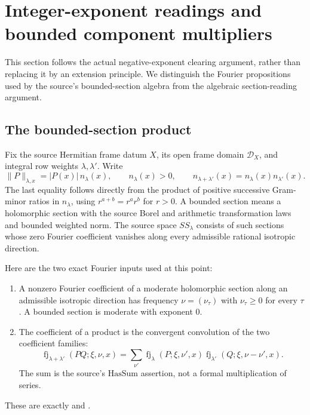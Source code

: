 \section{Integer-exponent readings and bounded component multipliers}
\label{sec:sr-source-integer-reading}
This section follows the actual negative-exponent clearing argument,
rather than replacing it by an extension principle.
We distinguish the Fourier propositions used by the source's
bounded-section algebra from the algebraic section-reading argument.

\subsection{The bounded-section product}
Fix the source Hermitian frame datum \(X\), its open frame domain
\(\mathcal D_X\), and integral row weights \(\lambda,\lambda'\).
Write
\[
 \|P\|_{\lambda,x}=|P(x)|\,n_\lambda(x),\qquad
 n_\lambda(x)>0,\qquad
 n_{\lambda+\lambda'}(x)=n_\lambda(x)n_{\lambda'}(x).
 \tag{IR1}\label{eq:sr-source-reading-nfac}
\]
The last equality follows directly from the product of positive
successive Gram-minor ratios in \(n_\lambda\), using
\(r^{a+b}=r^ar^b\) for \(r>0\).
A bounded section means a holomorphic section with the source
Borel and arithmetic transformation laws and bounded weighted norm.
The source space \(SS_\lambda\) consists of such sections whose
zero Fourier coefficient vanishes along every admissible rational
isotropic direction.

Here are the two exact Fourier inputs used at this point:
\begin{enumerate}
\item A nonzero Fourier coefficient of a moderate holomorphic section
along an admissible isotropic direction has frequency
\(\nu=(\nu_\tau)\) with \(\nu_\tau\ge0\) for every \(\tau\).
A bounded section is moderate with exponent \(0\).
\item The coefficient of a product is the convergent convolution of
the two coefficient families:
\[
 \operatorname{fj}_{\lambda+\lambda'}(PQ;\xi,\nu,x)
 =\sum_{\nu'}\operatorname{fj}_\lambda(P;\xi,\nu',x)
       \operatorname{fj}_{\lambda'}(Q;\xi,\nu-\nu',x).
 \tag{IR2}\label{eq:sr-source-reading-convolution}
\]
The sum is the source's \(\mathrm{HasSum}\) assertion, not a
formal multiplication of series.
\end{enumerate}
These are exactly  and
.

